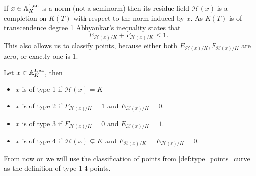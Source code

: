 If $x \in \mathbb{A}_K^{1, \text{an}}$ is a norm (not a seminorm) then its residue field $\mathcal{H} (x)$ is a completion on $K(T)$ with respect to the norm induced by $x$. As $K(T)$ is of transcendence degree 1 Abhyankar's inequality states that \[
	E_{\mathcal{H} (x) / K} + F_{\mathcal{H} (x) / K} \le 1
.\] 
This also allows us to classify points, because either both $E_{\mathcal{H} (x) / K}, F_{\mathcal{H} (x) / K}$ are zero, or exactly one is $1$. 
\begin{proposition}\label{def:type_points_curve}
	Let $x \in \mathbb{A}_K^{1, \text{an}}$, then 
	\begin{itemize}
		\item $x$ is of type 1 if $\mathcal{H} (x) = K$
		\item $x$ is of type 2 if $F_{\mathcal{H} (x) / K} = 1$ and $E_{\mathcal{H} (x) / K} = 0$. 
		\item $x$ is of type 3 if $F_{\mathcal{H} (x) / K} = 0$ and $E_{\mathcal{H} (x) / K} = 1$.
		\item $x$ is of type 4 if $\mathcal{H} (x) \subsetneq K$ and  $F_{\mathcal{H} (x) / K} = E_{\mathcal{H} (x) / K} = 0$.
	\end{itemize}
\end{proposition}

\begin{remark}
	From now on we will use the classification of points from \cref{def:type_points_curve} as the definition of type 1-4 points.
\end{remark}



